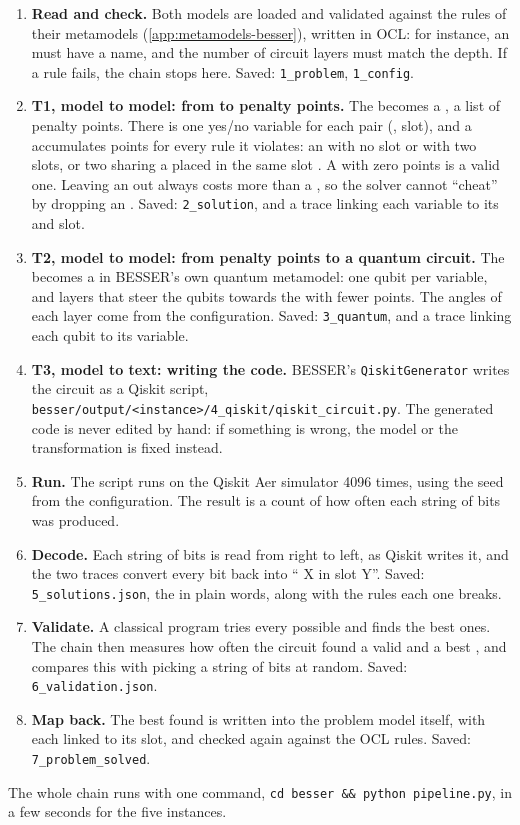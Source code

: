 \begin{enumerate}
	\item \textbf{Read and check.} Both models are loaded and validated against the rules of their metamodels (\cref{app:metamodels-besser}), written in OCL: for instance, an  must have a name, and the number of circuit layers must match the depth. If a rule fails, the chain stops here.
	      Saved: \texttt{1\_problem}, \texttt{1\_config}.
	\item \textbf{T1, model to model: from  to penalty points.} The  becomes a , a list of penalty points. There is one yes/no variable for each pair (, slot), and a  accumulates points for every rule it violates: an  with no slot or with two slots, or two  sharing a  placed in the same slot \cite[§5.3]{Paper}. A  with zero points is a valid one. Leaving an  out always costs more than a , so the solver cannot ``cheat'' by dropping an  \cite[§2.3]{Lucas}. Saved: \texttt{2\_solution}, and a trace linking each variable to its  and slot.
	\item \textbf{T2, model to model: from penalty points to a quantum circuit.} The  becomes a  \cite{Farhi} in BESSER's own quantum metamodel: one qubit per variable, and layers that steer the qubits towards the  with fewer points. The angles of each layer come from the configuration. Saved: \texttt{3\_quantum}, and a trace linking each qubit to its variable.
	\item \textbf{T3, model to text: writing the code.} BESSER's \texttt{QiskitGenerator} writes the circuit as a Qiskit script, \texttt{besser/output/<instance>/4\_qiskit/qiskit\_circuit.py}. The generated code is never edited by hand: if something is wrong, the model or the transformation is fixed instead.
	\item \textbf{Run.} The script runs on the Qiskit Aer simulator \cite{Qiskit} 4096 times, using the seed from the configuration. The result is a count of how often each string of bits was produced.
	\item \textbf{Decode.} Each string of bits is read from right to left, as Qiskit writes it, and the two traces convert every bit back into `` X in slot Y''. Saved: \texttt{5\_solutions.json}, the  in plain words, along with the rules each one breaks.
	\item \textbf{Validate.} A classical program tries every possible  and finds the best ones. The chain then measures how often the circuit found a valid  and a best , and compares this with picking a string of bits at random. Saved: \texttt{6\_validation.json}.
	\item \textbf{Map back.} The best  found is written into the problem model itself, with each  linked to its slot, and checked again against the OCL rules. Saved: \texttt{7\_problem\_solved}.
\end{enumerate}

The whole chain runs with one command, \texttt{cd besser \&\& python pipeline.py}, in a few seconds for the five instances.